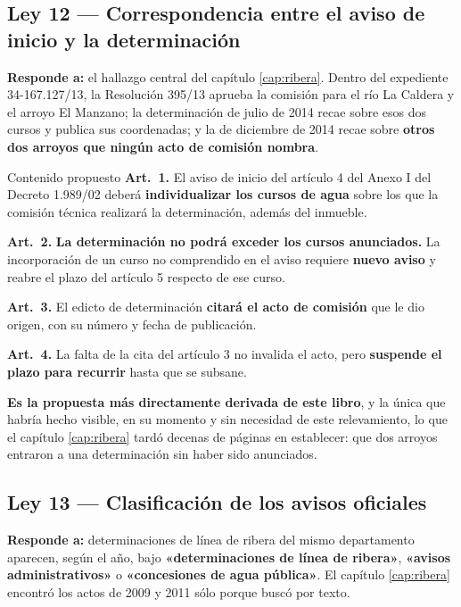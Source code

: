 \subsection{Ley 12 --- Correspondencia entre el aviso de inicio y la determinación}

\textbf{Responde a:} el hallazgo central del capítulo \ref{cap:ribera}. Dentro del expediente
34-167.127/13, la Resolución 395/13 aprueba la comisión para el río La Caldera y el arroyo El
Manzano; la determinación de julio de 2014 recae sobre esos dos cursos y publica sus
coordenadas; y la de diciembre de 2014 recae sobre \textbf{otros dos arroyos que ningún acto de
comisión nombra}.

\begin{ficha}{Contenido propuesto}
\textbf{Art.\ 1.} El aviso de inicio del artículo 4 del Anexo I del Decreto 1.989/02 deberá
\textbf{individualizar los cursos de agua} sobre los que la comisión técnica realizará la
determinación, además del inmueble.

\textbf{Art.\ 2.} \textbf{La determinación no podrá exceder los cursos anunciados.} La
incorporación de un curso no comprendido en el aviso requiere \textbf{nuevo aviso} y reabre el
plazo del artículo 5 respecto de ese curso.

\textbf{Art.\ 3.} El edicto de determinación \textbf{citará el acto de comisión} que le dio
origen, con su número y fecha de publicación.

\textbf{Art.\ 4.} La falta de la cita del artículo 3 no invalida el acto, pero \textbf{suspende
el plazo para recurrir} hasta que se subsane.
\end{ficha}

\textbf{Es la propuesta más directamente derivada de este libro}, y la única que habría hecho
visible, en su momento y sin necesidad de este relevamiento, lo que el capítulo \ref{cap:ribera} tardó decenas de páginas en establecer: que dos arroyos entraron a una
determinación sin haber sido anunciados.

\subsection{Ley 13 --- Clasificación de los avisos oficiales}

\textbf{Responde a:} determinaciones de línea de ribera del mismo departamento aparecen, según
el año, bajo \textbf{«determinaciones de línea de ribera»}, \textbf{«avisos administrativos»} o
\textbf{«concesiones de agua pública»}. El capítulo \ref{cap:ribera} encontró los actos de 2009
y 2011 sólo porque buscó por texto.

